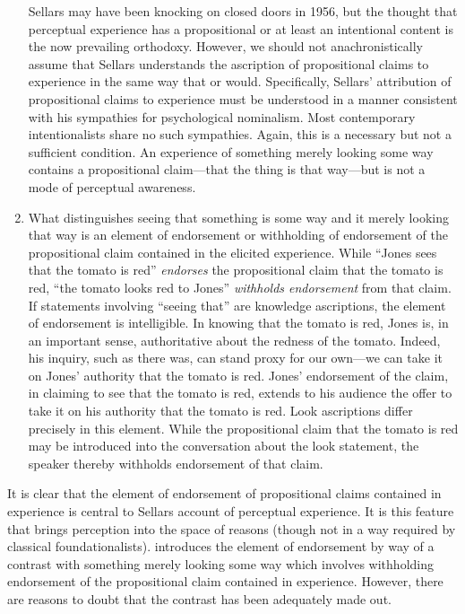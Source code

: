 \documentclass[12pt]{article}
\begin{document}
\begin{enumerate}
    Sellars may have been knocking on closed doors in 1956, but the thought that perceptual experience has a propositional or at least an intentional content is the now prevailing orthodoxy. However, we should not anachronistically assume that Sellars understands the ascription of propositional claims to experience in the same way that \citet[]{Harman:1990lm} or \citet[]{Tye:2000vn} would. Specifically, Sellars' attribution of propositional claims to experience must be understood in a manner consistent with his sympathies for psychological nominalism. Most contemporary intentionalists share no such sympathies. Again, this is a necessary but not a sufficient condition. An experience of something merely looking some way contains a propositional claim---that the thing is that way---but is not a mode of perceptual awareness.
    \item What distinguishes seeing that something is some way and it merely looking that way is an element of endorsement or withholding of endorsement of the propositional claim contained in the elicited experience. While ``Jones sees that the tomato is red'' \emph{endorses} the propositional claim that the tomato is red, ``the tomato looks red to Jones'' \emph{withholds endorsement} from that claim. If statements involving ``seeing that'' are knowledge ascriptions, the element of endorsement is intelligible. In knowing that the tomato is red, Jones is, in an important sense, authoritative about the redness of the tomato. Indeed, his inquiry, such as there was, can stand proxy for our own---we can take it on Jones' authority that the tomato is red. Jones' endorsement of the claim, in claiming to see that the tomato is red, extends to his audience the offer to take it on his authority that the tomato is red. Look ascriptions differ precisely in this element. While the propositional claim that the tomato is red may be introduced into the conversation about the look statement, the speaker thereby withholds endorsement of that claim. 
\end{enumerate}

It is clear that the element of endorsement of propositional claims contained in experience is central to Sellars account of perceptual experience. It is this feature that brings perception into the space of reasons (though not in a way required by classical foundationalists). \citet[§§16--17]{Sellars:1956xp} introduces the element of endorsement by way of a contrast with something merely looking some way which involves withholding endorsement of the propositional claim contained in experience. However, there are reasons to doubt that the contrast has been adequately made out.
\end{document}
